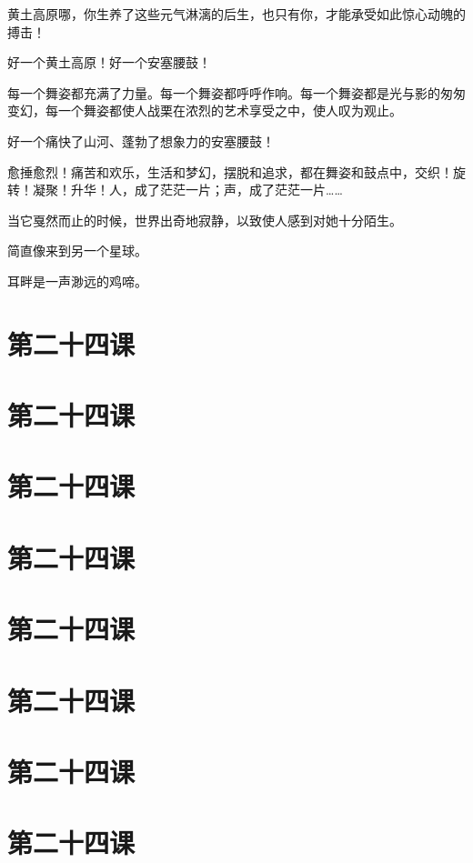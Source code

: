 \documentclass[12pt,UTF8]{ctexbook}
\begin{document}
黄土高原哪，你生养了这些元气淋漓的后生，也只有你，才能承受如此惊心动魄的搏击！

好一个黄土高原！好一个安塞腰鼓！

每一个舞姿都充满了力量。每一个舞姿都呼呼作响。每一个舞姿都是光与影的匆匆变幻，每一个舞姿都使人战栗在浓烈的艺术享受之中，使人叹为观止。

好一个痛快了山河、蓬勃了想象力的安塞腰鼓！

愈捶愈烈！痛苦和欢乐，生活和梦幻，摆脱和追求，都在舞姿和鼓点中，交织！旋转！凝聚！升华！人，成了茫茫一片；声，成了茫茫一片……

当它戛然而止的时候，世界出奇地寂静，以致使人感到对她十分陌生。

简直像来到另一个星球。

耳畔是一声渺远的鸡啼。

\section{第二十四课}

\section{第二十四课}

\section{第二十四课}

\section{第二十四课}

\section{第二十四课}

\section{第二十四课}

\section{第二十四课}

\section{第二十四课}
\end{document}
